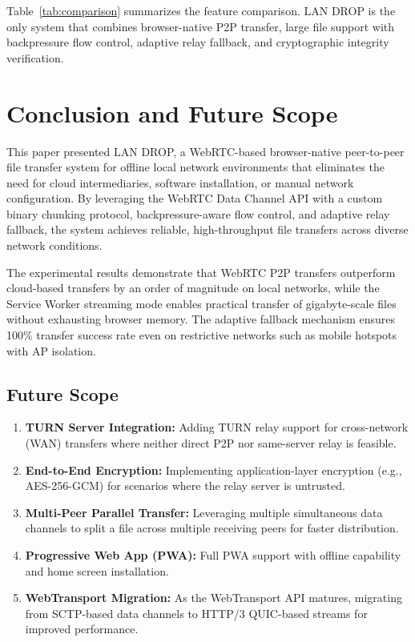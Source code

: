 \documentclass[conference]{IEEEtran}
\begin{document}
Table~\ref{tab:comparison} summarizes the feature comparison. LAN DROP is the only system that combines browser-native P2P transfer, large file support with backpressure flow control, adaptive relay fallback, and cryptographic integrity verification.

\section{Conclusion and Future Scope}

This paper presented LAN DROP, a WebRTC-based browser-native peer-to-peer file transfer system for offline local network environments that eliminates the need for cloud intermediaries, software installation, or manual network configuration. By leveraging the WebRTC Data Channel API with a custom binary chunking protocol, backpressure-aware flow control, and adaptive relay fallback, the system achieves reliable, high-throughput file transfers across diverse network conditions.

The experimental results demonstrate that WebRTC P2P transfers outperform cloud-based transfers by an order of magnitude on local networks, while the Service Worker streaming mode enables practical transfer of gigabyte-scale files without exhausting browser memory. The adaptive fallback mechanism ensures 100\% transfer success rate even on restrictive networks such as mobile hotspots with AP isolation.

\subsection{Future Scope}
\begin{enumerate}
    \item \textbf{TURN Server Integration:} Adding TURN relay support for cross-network (WAN) transfers where neither direct P2P nor same-server relay is feasible.
    \item \textbf{End-to-End Encryption:} Implementing application-layer encryption (e.g., AES-256-GCM) for scenarios where the relay server is untrusted.
    \item \textbf{Multi-Peer Parallel Transfer:} Leveraging multiple simultaneous data channels to split a file across multiple receiving peers for faster distribution.
    \item \textbf{Progressive Web App (PWA):} Full PWA support with offline capability and home screen installation.
    \item \textbf{WebTransport Migration:} As the WebTransport API matures, migrating from SCTP-based data channels to HTTP/3 QUIC-based streams for improved performance.
\end{enumerate}
\end{document}
